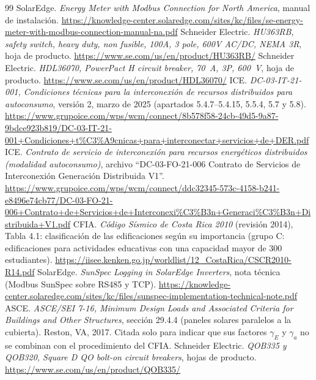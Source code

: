 \documentclass[12pt]{article}
\begin{document}
\begin{thebibliography}{99}
 SolarEdge. \emph{Energy Meter with Modbus Connection for North America}, manual de instalación. \url{https://knowledge-center.solaredge.com/sites/kc/files/se-energy-meter-with-modbus-connection-manual-na.pdf}
 Schneider Electric. \emph{HU363RB, safety switch, heavy duty, non fusible, 100A, 3 pole, 600V AC/DC, NEMA 3R}, hoja de producto. \url{https://www.se.com/us/en/product/HU363RB/}
 Schneider Electric. \emph{HDL36070, PowerPact H circuit breaker, 70~A, 3P, 600~V}, hoja de producto. \url{https://www.se.com/us/en/product/HDL36070/}
 ICE. \emph{DC-03-IT-21-001, Condiciones técnicas para la interconexión de recursos distribuidos para autoconsumo}, versión 2, marzo de 2025 (apartados 5.4.7--5.4.15, 5.5.4, 5.7 y 5.8). \url{https://www.grupoice.com/wps/wcm/connect/8b578f58-24cb-49d5-9a87-9bdce923b819/DC-03-IT-21-001+Condiciones+t\%C3\%A9cnicas+para+interconectar+servicios+de+DER.pdf}
 ICE. \emph{Contrato de servicio de interconexión para recursos energéticos distribuidos (modalidad autoconsumo)}, archivo ``DC-03-FO-21-006 Contrato de Servicios de Interconexión Generación Distribuida V1''. \url{https://www.grupoice.com/wps/wcm/connect/ddc32345-573c-4158-b241-e8496e74cb77/DC-03-FO-21-006+Contrato+de+Servicios+de+Interconexi\%C3\%B3n+Generaci\%C3\%B3n+Distribuida+V1.pdf}
 CFIA. \emph{Código Sísmico de Costa Rica 2010} (revisión 2014), Tabla 4.1: clasificación de las edificaciones según su importancia (grupo C: edificaciones para actividades educativas con una capacidad mayor de 300 estudiantes). \url{https://iisee.kenken.go.jp/worldlist/12_CostaRica/CSCR2010-R14.pdf}
 SolarEdge. \emph{SunSpec Logging in SolarEdge Inverters}, nota técnica (Modbus SunSpec sobre RS485 y TCP). \url{https://knowledge-center.solaredge.com/sites/kc/files/sunspec-implementation-technical-note.pdf}
 ASCE. \emph{ASCE/SEI 7-16, Minimum Design Loads and Associated Criteria for Buildings and Other Structures}, sección 29.4.4 (paneles solares paralelos a la cubierta). Reston, VA, 2017. Citada solo para indicar que sus factores $\gamma_E$ y $\gamma_a$ no se combinan con el procedimiento del CFIA.
 Schneider Electric. \emph{QOB335 y QOB320, Square D QO bolt-on circuit breakers}, hojas de producto. \url{https://www.se.com/us/en/product/QOB335/}
\end{thebibliography}

\appendix
\end{document}
